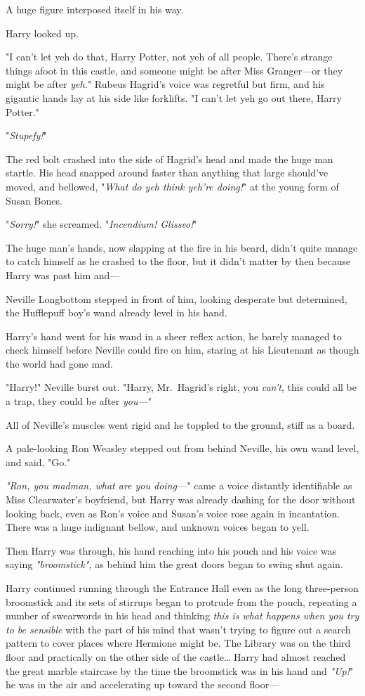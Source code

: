 A huge figure interposed itself in his way.

Harry looked up.

"I can't let yeh do that, Harry Potter, not yeh of all people. There's strange things afoot in this castle, and someone might be after Miss Granger---or they might be after \emph{yeh.}" Rubeus Hagrid's voice was regretful but firm, and his gigantic hands lay at his side like forklifts. "I can't let yeh go out there, Harry Potter."

"\emph{Stupefy!}"

The red bolt crashed into the side of Hagrid's head and made the huge man startle. His head snapped around faster than anything that large should've moved, and bellowed, "\emph{What do yeh think yeh're doing!}" at the young form of Susan Bones.

"\emph{Sorry!}" she screamed. "\emph{Incendium! Glisseo!}"

The huge man's hands, now slapping at the fire in his beard, didn't quite manage to catch himself as he crashed to the floor, but it didn't matter by then because Harry was past him and---

Neville Longbottom stepped in front of him, looking desperate but determined, the Hufflepuff boy's wand already level in his hand.

Harry's hand went for his wand in a sheer reflex action, he barely managed to check himself before Neville could fire on him, staring at his Lieutenant as though the world had gone mad.

"Harry!" Neville burst out. "Harry, Mr.~Hagrid's right, you \emph{can't}, this could all be a trap, they could be after \emph{you---}"

All of Neville's muscles went rigid and he toppled to the ground, stiff as a board.

A pale-looking Ron Weasley stepped out from behind Neville, his own wand level, and said, "Go."

\emph{"Ron, you madman, what are you doing---}" came a voice distantly identifiable as Miss Clearwater's boyfriend, but Harry was already dashing for the door without looking back, even as Ron's voice and Susan's voice rose again in incantation. There was a huge indignant bellow, and unknown voices began to yell.

Then Harry was through, his hand reaching into his pouch and his voice was saying \emph{"broomstick",} as behind him the great doors began to swing shut again.

Harry continued running through the Entrance Hall even as the long three-person broomstick and its sets of stirrups began to protrude from the pouch, repeating a number of swearwords in his head and thinking \emph{this is what happens when you try to be sensible} with the part of his mind that wasn't trying to figure out a search pattern to cover places where Hermione might be. The Library was on the third floor and practically on the other side of the castle{\ldots} Harry had almost reached the great marble staircase by the time the broomstick was in his hand and \emph{"Up!}" he was in the air and accelerating up toward the second floor---

